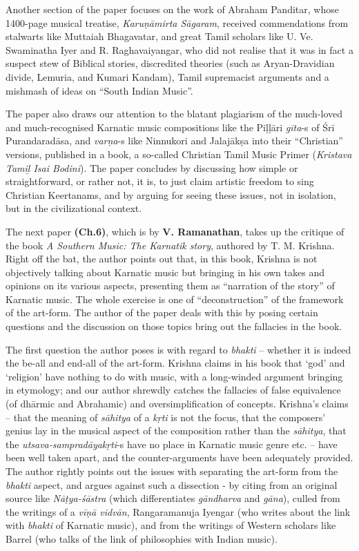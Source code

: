 Another section of the paper focuses on the work of Abraham Panditar, whose 1400-page musical treatise, \textit{Karuṇāmirta Sāgaram}, received commendations from stalwarts like Muttaiah Bhagavatar, and great Tamil scholars like U. Ve. Swaminatha Iyer and R. Raghavaiyangar, who did not realise that it was in fact a suspect stew of Biblical stories, discredited theories (such as Aryan-Dravidian divide, Lemuria, and Kumari Kandam), Tamil supremacist arguments and a mishmash of ideas on “South Indian Music”.

The paper also draws our attention to the blatant plagiarism of the much-loved and much-recognised Karnatic music compositions like the Piḷḷāri \textit{gīta}-s of Śrī Purandaradāsa, and \textit{varṇa}-s like Ninnukori and Jalajākṣa into their “Christian” versions, published in a book, a so-called Christian Tamil Music Primer (\textit{Kristava Tamiḻ Isai Bodini}). The paper concludes by discussing how simple or straightforward, or rather not, it is, to just claim artistic freedom to sing Christian Keertanams, and by arguing for seeing these issues, not in isolation, but in the civilizational context.

The next paper \textbf{(Ch.6)}, which is by \textbf{V. Ramanathan}, takes up the critique of the book \textit{A Southern Music: The Karnatik story}, authored by T. M. Krishna. Right off the bat, the author points out that, in this book, Krishna is not objectively talking about Karnatic music but bringing in his own takes and opinions on its various aspects, presenting them as “narration of the story” of Karnatic music. The whole exercise is one of “deconstruction” of the framework of the art-form. The author of the paper deals with this by posing certain questions and the discussion on those topics bring out the fallacies in the book.

The first question the author poses is with regard to \textit{bhakti} – whether it is indeed the be-all and end-all of the art-form. Krishna claims in his book that ‘god’ and ‘religion’ have nothing to do with music, with a long-winded argument bringing in etymology; and our author shrewdly catches the fallacies of false equivalence (of dhārmic and Abrahamic) and oversimplification of concepts. Krishna’s claims – that the meaning of \textit{sāhitya} of a \textit{kṛti} is not the focus, that the composers’ genius lay in the musical aspect of the composition rather than the \textit{sāhitya}, that the \textit{utsava-sampradāya}\textit{kṛti}-s have no place in Karnatic music genre etc. – have been well taken apart, and the counter-arguments have been adequately provided. The author rightly points out the issues with separating the art-form from the \textit{bhakti} aspect, and argues against such a dissection - by citing from an original source like \textit{Nāṭya-śāstra} (which differentiates \textit{gāndharva} and \textit{gāna}), culled from the writings of a \textit{vīṇā vidvān}, Rangaramanuja Iyengar (who writes about the link with \textit{bhakti} of Karnatic music), and from the writings of Western scholars like Barrel (who talks of the link of philosophies with Indian music).

